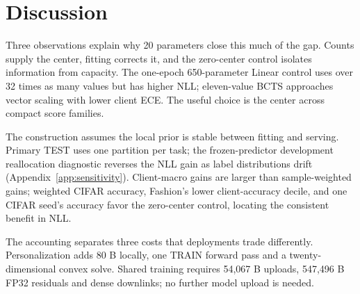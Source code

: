 \section{Discussion}
Three observations explain why 20 parameters close this much of the gap. Counts supply the center, fitting corrects it, and the zero-center control isolates information from capacity. The one-epoch 650-parameter Linear control uses over 32 times as many values but has higher NLL; eleven-value BCTS approaches vector scaling with lower client ECE. The useful choice is the center across compact score families.

The construction assumes the local prior is stable between fitting and serving. Primary TEST uses one partition per task; the frozen-predictor development reallocation diagnostic reverses the NLL gain as label distributions drift (Appendix~\ref{app:sensitivity}). Client-macro gains are larger than sample-weighted gains; weighted CIFAR accuracy, Fashion's lower client-accuracy decile, and one CIFAR seed's accuracy favor the zero-center control, locating the consistent benefit in NLL.

The accounting separates three costs that deployments trade differently. Personalization adds 80 B locally, one TRAIN forward pass and a twenty-dimensional convex solve. Shared training requires 54,067 B uploads, 547,496 B FP32 residuals and dense downlinks; no further model upload is needed.